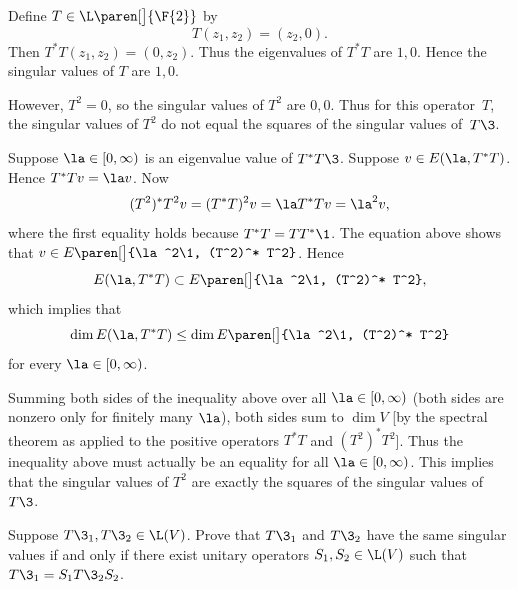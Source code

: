 \begin{Solution}
\begin{subtheorem}
\item
Define $T \in \L\paren[\big]{\F{2}}$ by
\[
T(z_1, z_2) = (z_2, 0).
\]
Then $T^* T(z_1, z_2) = (0, z_2)$. Thus
the eigenvalues of $T^* T$ are $1,0$.  Hence the singular values of $T$ are
$1,0$.

However, $T^2 = 0$, so the singular values of $T^2$ are $0, 0$.  Thus for this
operator~$T$, the singular values of $T^2$ do not
equal the squares of the singular values of~$T\3$.

\item
Suppose $\la \in [0, \infty)$ is an eigenvalue value of $T^* T\3$. Suppose $v \in E(\la, T^* T)$. Hence $T^*T v = \la v$. Now
\[
(T^2)^* T^2 v = (T^*T)^2 v = \la T^*T v = \la^2 v,
\]
where the first equality holds because $T^*T = TT^*\1$. The equation above shows that $v \in E\paren[\big]{\la^2\1, (T^2)^* T^2}$. Hence
\[
E(\la, T^* T) \subset E\paren[\big]{\la^2\1, (T^2)^* T^2},
\]
which implies that
\[
\dim E(\la, T^* T) \le \dim E\paren[\big]{\la^2\1, (T^2)^* T^2}
\]
for every $\la \in [0, \infty)$.

Summing both sides of the inequality above over all $\la \in [0, \infty)$ (both sides are nonzero only for finitely many $\la$), both sides sum to $\dim V$ [by the spectral theorem as applied to the positive operators $T^*T$ and $(T^2)^* T^2$]. Thus the inequality above must actually be an equality for all $\la \in [0, \infty)$. This implies that the singular values of $T^2$ are exactly the squares of the singular values of $T\3$.
\end{subtheorem}
\end{Solution}

\exercise
Suppose $T\3_1, T\3_2 \in \L(V)$.  Prove that $T\3_1$ and $T\3_2$ have the
same singular values if and only if there exist unitary operators $S_1, S_2
\in \L(V)$ such that $T\3_1 = S_1 T\3_2 S_2$.

